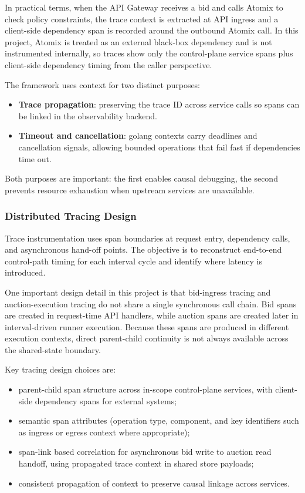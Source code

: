 In practical terms, when the API Gateway receives a bid and calls Atomix to check policy constraints, the trace context is extracted at API ingress and a client-side dependency span is recorded around the outbound Atomix call. In this project, Atomix is treated as an external black-box dependency and is not instrumented internally, so traces show only the control-plane service spans plus client-side dependency timing from the caller perspective.

The framework uses context for two distinct purposes:
\begin{itemize}
	\item \textbf{Trace propagation}: preserving the trace ID across service calls so spans can be linked in the observability backend.
	\item \textbf{Timeout and cancellation}: golang contexts carry deadlines and cancellation signals, allowing bounded operations that fail fast if dependencies time out.
\end{itemize}

Both purposes are important: the first enables causal debugging, the second prevents resource exhaustion when upstream services are unavailable.

\subsubsection{Distributed Tracing Design}

Trace instrumentation uses span boundaries at request entry, dependency calls, and asynchronous hand-off points. The objective is to reconstruct end-to-end control-path timing for each interval cycle and identify where latency is introduced.

One important design detail in this project is that bid-ingress tracing and auction-execution tracing do not share a single synchronous call chain. Bid spans are created in request-time API handlers, while auction spans are created later in interval-driven runner execution. Because these spans are produced in different execution contexts, direct parent-child continuity is not always available across the shared-state boundary.

Key tracing design choices are:

\begin{itemize}
\item parent-child span structure across in-scope control-plane services, with client-side dependency spans for external systems;
\item semantic span attributes (operation type, component, and key identifiers such as ingress or egress context where appropriate);
\item span-link based correlation for asynchronous bid write to auction read handoff, using propagated trace context in shared store payloads;
\item consistent propagation of context to preserve causal linkage across services.
\end{itemize}

